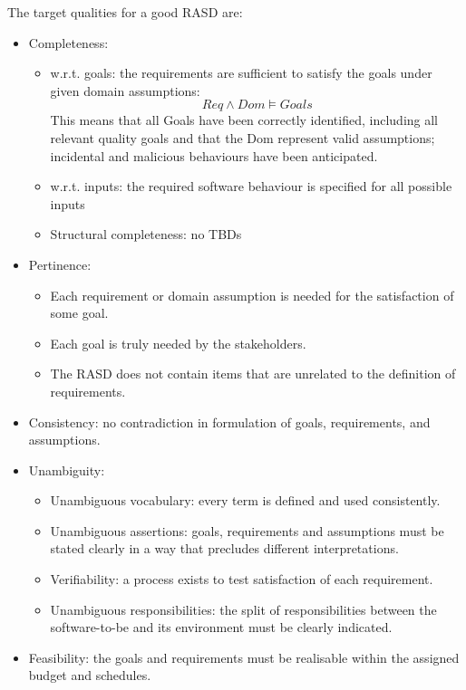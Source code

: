 \documentclass[12pt, a4paper]{report}
\newtheorem[style=M,bodystyle=\normalfont]{theorem}{Theorem}
\newtheorem[style=M,bodystyle=\normalfont]{corollary}{Corollary}
\newtheorem[style=M,bodystyle=\normalfont]{lemma}{Lemma}
\newtheorem[style=M,bodystyle=\normalfont]{definition}{Definition}
\begin{document}
    \par
    The target qualities for a good RASD are: 
    \begin{itemize}
        \item Completeness:
        \begin{itemize}
            \item w.r.t. goals: the requirements are sufficient to satisfy the goals under given domain assumptions: 
            \[Req \land Dom \models Goals\]
            This means that all Goals have been correctly identified, including all relevant quality goals and that the Dom represent valid assumptions; incidental and malicious behaviours have been anticipated. 
            \item w.r.t. inputs: the required software behaviour is specified for all possible inputs
            \item Structural completeness: no TBDs
        \end{itemize}
        \item Pertinence: 
        \begin{itemize}
            \item Each requirement or domain assumption is needed for the satisfaction of some goal. 
            \item Each goal is truly needed by the stakeholders. 
            \item The RASD does not contain items that are unrelated to the definition of requirements.
        \end{itemize}
        \item Consistency: no contradiction in formulation of goals, requirements, and assumptions. 
        \item Unambiguity: 
        \begin{itemize}
            \item Unambiguous vocabulary: every term is defined and used consistently.
            \item Unambiguous assertions: goals, requirements and assumptions must be stated clearly in a way that precludes different interpretations.
            \item Verifiability: a process exists to test satisfaction of each requirement.
            \item Unambiguous responsibilities: the split of responsibilities between the software-to-be and its environment must be clearly indicated. 
        \end{itemize}
        \item Feasibility: the goals and requirements must be realisable within the assigned budget and schedules. 

\end{itemize}
\end{document}

